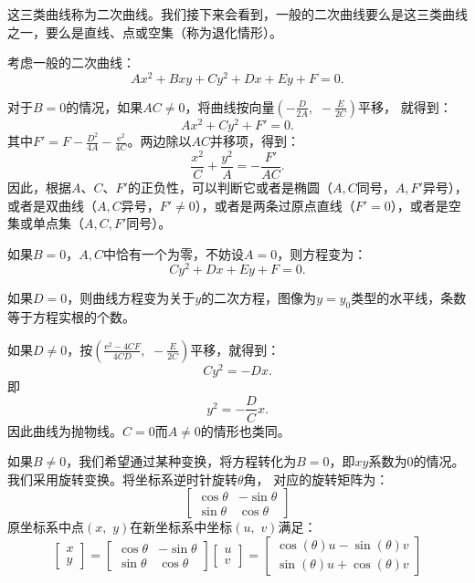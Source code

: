\documentclass[12pt,UTF8]{ctexbook}
\newcommand{\e}{\mathrm{e}}
\theoremstyle{definition}
\theoremstyle{plain}
\begin{document}
这三类曲线称为二次曲线。我们接下来会看到，一般的二次曲线要么是这三类曲线之一，要么是直线、点或空集（称为退化情形）。

考虑一般的二次曲线：
$$ Ax^2 + Bxy + Cy^2 + Dx + Ey + F = 0.$$

对于$B = 0$的情况，如果$AC\neq 0$，将曲线按向量$\displaystyle\left(-\frac{D}{2A},\,\,-\frac{E}{2C}\right)$平移，
就得到：
$$ Ax^2 + Cy^2 + F' = 0.$$
其中$F' = F - \frac{D^2}{4A} - \frac{\e^2}{4C}$。两边除以$AC$并移项，得到：
$$ \frac{x^2}{C} + \frac{y^2}{A} = -\frac{F'}{AC}.$$
因此，根据$A$、$C$、$F'$的正负性，可以判断它或者是椭圆（$A,C$同号，$A,F'$异号），
或者是双曲线（$A,C$异号，$F' \neq 0$），或者是两条过原点直线（$F' = 0$），或者是空集或单点集（$A,C,F'$同号）。

如果$B = 0$，$A,C$中恰有一个为零，不妨设$A = 0$，则方程变为：
$$ Cy^2 + Dx + Ey + F = 0.$$

如果$D = 0$，则曲线方程变为关于$y$的二次方程，图像为$y = y_0$类型的水平线，条数等于方程实根的个数。

如果$D\neq 0$，按$\displaystyle\left(\frac{\e^2 - 4CF}{4CD},\,\,-\frac{E}{2C}\right)$平移，就得到：
$$ Cy^2 = -Dx. $$
即
$$ y^2 = -\frac{D}{C}x. $$
因此曲线为抛物线。$C=0$而$A\neq 0$的情形也类同。

如果$B\neq 0$，我们希望通过某种变换，将方程转化为$B = 0$，即$xy$系数为$0$的情况。我们采用旋转变换。将坐标系逆时针旋转$\theta$角，
对应的旋转矩阵为：
$$
\begin{bmatrix}
    \cos{\theta} & -\sin{\theta} \\
    \sin{\theta} & \cos{\theta} 
\end{bmatrix}
$$
原坐标系中点$(x,\,\,y)$在新坐标系中坐标$(u,\,\,v)$满足：
$$
\begin{bmatrix}
    x \\ y
\end{bmatrix}
=
\begin{bmatrix}
    \cos{\theta} & -\sin{\theta} \\
    \sin{\theta} & \cos{\theta} 
\end{bmatrix}
\begin{bmatrix}
    u \\ v
\end{bmatrix}
= 
\begin{bmatrix}
    \cos{(\theta)}u - \sin{(\theta)}v \\ \sin{(\theta)}u + \cos{(\theta)}v
\end{bmatrix}
$$

\end{document}
